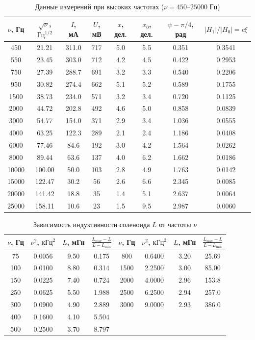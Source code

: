 \documentclass[12pt]{extarticle}
\begin{document}
\begin{table}[H]
	\centering
	\caption{Данные измерений при высоких частотах ($\nu = 450\text{--}25000\text{ Гц}$)}
	\label{tab:phase_high}
	\begin{tabular}{cccccccc}
		\toprule
		$\nu$, Гц & $\sqrt{\nu}$, $\text{Гц}^{1/2}$ & $I$, мА & $U$, мВ & $x$, дел. & $x_0$, дел. & $\psi - \pi/4$, рад & $|H_1|/|H_0| = c\xi$ \\
		\midrule
		450   & 21.21  & 311.0 & 717 & 5.0 & 5.5 & 0.351 & 0.3541 \\
		550   & 23.45  & 303.0 & 712 & 4.2 & 4.5 & 0.422 & 0.2953 \\
		750   & 27.39  & 288.7 & 691 & 3.2 & 3.3 & 0.540 & 0.2206 \\
		950   & 30.82  & 274.4 & 662 & 5.1 & 5.2 & 0.589 & 0.1755 \\
		1500  & 38.73  & 234.0 & 571 & 3.2 & 3.4 & 0.720 & 0.1125 \\
		2000  & 44.72  & 202.8 & 492 & 4.6 & 5.0 & 0.858 & 0.0839 \\
		3000  & 54.77  & 154.0 & 371 & 2.9 & 3.4 & 1.036 & 0.0555 \\
		4000  & 63.25  & 122.3 & 289 & 2.1 & 2.4 & 1.186 & 0.0408 \\
		6000  & 77.46  & 84.6  & 192 & 3.0 & 4.2 & 1.564 & 0.0262 \\
		8000  & 89.44  & 63.6  & 137 & 4.0 & 6.2 & 1.662 & 0.0186 \\
		10000 & 100.00 & 50.0  & 103 & 2.8 & 4.9 & 1.763 & 0.0142 \\
		15000 & 122.47 & 30.2  & 56  & 2.6 & 6.6 & 2.345 & 0.0085 \\
		20000 & 141.42 & 18.8  & 35  & 1.4 & 5.1 & 2.637 & 0.0064 \\
		25000 & 158.11 & 10.6  & 23  & 1.5 & 9.5 & 2.987 & 0.0060 \\
		\bottomrule
	\end{tabular}
\end{table}

\begin{table}[H]
	\centering
	\caption{Зависимость индуктивности соленоида $L$ от частоты $\nu$}
	\label{tab:inductance}
	\begin{tabular}{cccc|cccc}
		\toprule
		$\nu$, Гц & $\nu^2$, $\text{кГц}^2$ & $L$, мГн & $\frac{L_{\max}-L}{L-L_{\min}}$ & $\nu$, Гц & $\nu^2$, $\text{кГц}^2$ & $L$, мГн & $\frac{L_{\max}-L}{L-L_{\min}}$ \\
		\midrule
		75   & 0.0056 & 9.50 & 0.175 & 800  & 0.6400 & 3.20 & 25.69 \\
		100  & 0.0100 & 8.80 & 0.314 & 1500 & 2.2500 & 3.00 & 85.00 \\
		150  & 0.0225 & 7.40 & 0.724 & 2000 & 4.0000 & 2.96 & 153.8 \\
		250  & 0.0625 & 5.50 & 1.988 & 2500 & 6.2500 & 2.94 & 257.0 \\
		300  & 0.0900 & 4.90 & 2.889 & 3000 & 9.0000 & 2.93 & 386.0 \\
		400  & 0.1600 & 4.10 & 5.504 &      &        &      &       \\
		500  & 0.2500 & 3.70 & 8.797 &      &        &      &       \\
		\bottomrule
	\end{tabular}
\end{table}
\end{document}

